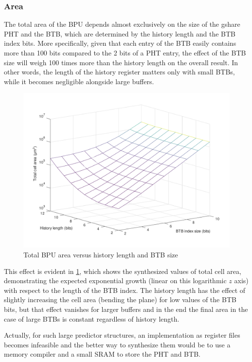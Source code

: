 \subsubsection{Area}
The total area of the \ac{BPU} depends almost exclusively on the size of the gshare \ac{PHT} and the \ac{BTB}, which are determined by the history length and the \ac{BTB} index bits. More specifically, given that each entry of the \ac{BTB} easily contains more than 100 bits compared to the 2 bits of a \ac{PHT} entry, the effect of the \ac{BTB} size will weigh 100 times more than the history length on the overall result. In other words, the length of the history register matters only with small \acp{BTB}, while it becomes negligible alongside large buffers.

\begin{figure}[hbt]
  \centering
  \includegraphics[width=\textwidth]{img/bpu_area.pdf}
  \caption{Total \acs{BPU} area versus history length and \ac{BTB} size}
  \label{fig:bpu_area}
\end{figure}
This effect is evident in \cref{fig:bpu_area}, which shows the synthesized values of total cell area, demonstrating the expected exponential growth (linear on this logarithmic $z$ axis) with respect to the length of the \ac{BTB} index. The history length has the effect of slightly increasing the cell area (bending the plane) for low values of the \ac{BTB} bits, but that effect vanishes for larger buffers and in the end the final area in the case of large \acp{BTB} is constant regardless of history length.

Actually, for such large predictor structures, an implementation as register files becomes infeasible and the better way to synthesize them would be to use a memory compiler and a small SRAM to store the \ac{PHT} and \ac{BTB}.

